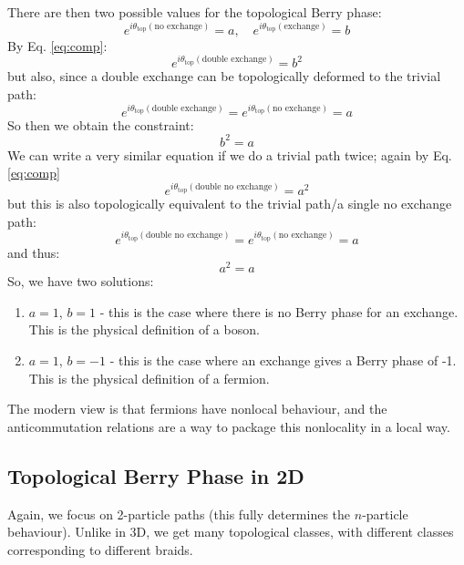 There are then two possible values for the topological Berry phase:
\begin{equation}
    e^{i\theta_{\text{top}}(\text{no exchange})} = a, \quad  e^{i\theta_{\text{top}}(\text{exchange})} = b
\end{equation}
By Eq. \eqref{eq:comp}:
\begin{equation}
    e^{i\theta_{\text{top}}(\text{double exchange})} = b^2
\end{equation}
but also, since a double exchange can be topologically deformed to the trivial path:
\begin{equation}
    e^{i\theta_{\text{top}}(\text{double exchange})} = e^{i\theta_{\text{top}}(\text{no exchange})} = a
\end{equation}
So then we obtain the constraint:
\begin{equation}
    b^2 = a
\end{equation}
We can write a very similar equation if we do a trivial path twice; again by Eq. \eqref{eq:comp}
\begin{equation}
    e^{i\theta_{\text{top}}(\text{double no exchange})} = a^2
\end{equation}
but this is also topologically equivalent to the trivial path/a single no exchange path:
\begin{equation}
    e^{i\theta_{\text{top}}(\text{double no exchange})} = e^{i\theta_{\text{top}}(\text{no exchange})} = a
\end{equation}
and thus:
\begin{equation}
    a^2 = a
\end{equation}
So, we have two solutions:
\begin{enumerate}
    \item $a = 1$, $b = 1$ - this is the case where there is no Berry phase for an exchange. This is the physical definition of a boson.
    \item $a = 1$, $b = -1$ - this is the case where an exchange gives a Berry phase of -1. This is the physical definition of a fermion.
\end{enumerate}
The modern view is that fermions have nonlocal behaviour, and the anticommutation relations are a way to package this nonlocality in a local way.

\subsection{Topological Berry Phase in 2D}
Again, we focus on 2-particle paths (this fully determines the $n$-particle behaviour). Unlike in 3D, we get many topological classes, with different classes corresponding to different braids.

